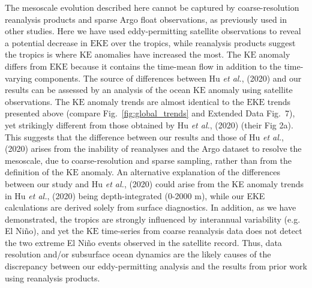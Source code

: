 \documentclass{nature}
\newcommand{\KE}{\text{KE}}
\newcommand{\EKE}{\text{EKE}}
\begin{document}
The mesoscale evolution described here cannot be captured by coarse-resolution reanalysis products and sparse Argo float observations, as previously used in other studies\cite{Hu_acceleration_2020}.
Here we have used eddy-permitting satellite observations to reveal a potential decrease in $\EKE$ over the tropics, while reanalysis products suggest the tropics is where $\KE$ anomalies have increased the most\cite{Hu_acceleration_2020}. The $\KE$ anomaly differs from $\EKE$ because it contains the time-mean flow in addition to the time-varying components. The source of differences between Hu \textit{et al.}, (2020)\cite{Hu_acceleration_2020} and our results can be assessed by an analysis of the ocean $\KE$ anomaly using satellite observations. The $\KE$ anomaly trends are almost identical to the $\EKE$ trends presented above (compare Fig.~\ref{fig:global_trends} and  Extended Data Fig.~7), yet strikingly different from those obtained by Hu \textit{et al.}, (2020) (their Fig 2a).
This suggests that the difference between our results and those of Hu \textit{et al.}, (2020) arises from the inability of reanalyses and the Argo dataset to resolve the mesoscale, due to coarse-resolution and sparse sampling, rather than from the definition of the $\KE$ anomaly. An alternative explanation of the differences between our study and Hu \textit{et al.}, (2020) could arise from the KE anomaly trends in Hu \textit{et al.}, (2020) being depth-integrated (0-2000 m), while our EKE calculations are derived solely from surface diagnostics. In addition, as we have demonstrated, the tropics are strongly influenced by interannual variability (e.g. El Niño), and yet the $\KE$ time-series from coarse reanalysis data does not detect the two extreme El Niño events observed in the satellite record. Thus, data resolution and/or subsurface ocean dynamics are the likely causes of the discrepancy between our eddy-permitting analysis and the results from prior work using reanalysis products\cite{Hu_acceleration_2020}.
\end{document}
